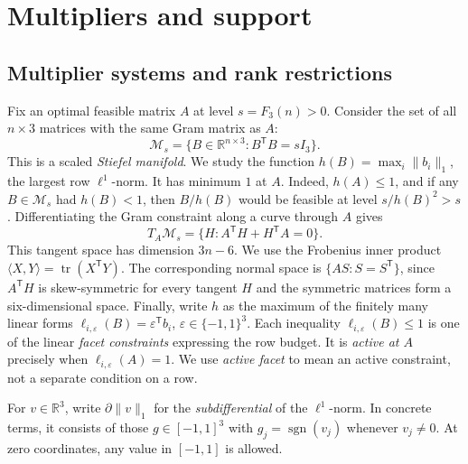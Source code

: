 \documentclass[11pt]{article}
\numberwithin{equation}{section}
\theoremstyle{definition}
\theoremstyle{definition}
\newcommand{\R}{\mathbb R}
\newcommand{\F}{F_3}
\newcommand{\norm}[1]{\lVert#1\rVert}
\DeclareMathOperator{\tr}{tr}
\begin{document}
\section{Multipliers and support}
\label{sec:variation}
\subsection{Multiplier systems and rank restrictions}
Fix an optimal feasible matrix $A$ at level $s=\F(n)>0$.
Consider the set of all $n\times3$ matrices with the same Gram
matrix as $A$:
\[
 \mathcal M_s=\{B\in\R^{n\times3}:B^{\mathsf T}B=sI_3\}.
\]
This is a scaled \emph{Stiefel manifold}. We study the function
$h(B)=\max_i\norm{b_i}_1$, the largest row $\ell^1$-norm.
It has minimum $1$ at $A$.
Indeed, $h(A)\le1$, and if any $B\in\mathcal M_s$ had $h(B)<1$,
then $B/h(B)$ would be feasible at level $s/h(B)^2>s$.
Differentiating the Gram constraint along a curve through $A$ gives
\[
 T_A\mathcal M_s=\{H:A^{\mathsf T}H+H^{\mathsf T}A=0\}.
\]
This tangent space has dimension $3n-6$. We use the Frobenius
inner product $\langle X,Y\rangle=\tr(X^{\mathsf T}Y)$.
The corresponding normal space is $\{AS:S=S^{\mathsf T}\}$, since
$A^{\mathsf T}H$ is skew-symmetric for every tangent $H$ and the
symmetric matrices form a six-dimensional space.
Finally, write $h$ as the maximum of the finitely many linear forms
$\ell_{i,\varepsilon}(B)=\varepsilon^{\mathsf T}b_i$,
$\varepsilon\in\{-1,1\}^3$. Each inequality
$\ell_{i,\varepsilon}(B)\le1$ is one of the linear \emph{facet
constraints} expressing the row budget. It is \emph{active at $A$}
precisely when $\ell_{i,\varepsilon}(A)=1$. We use \emph{active facet}
to mean an active constraint, not a separate condition on a row.

For $v\in\R^3$, write $\partial\|v\|_1$ for the \emph{subdifferential}
of the $\ell^1$-norm. In concrete terms, it consists of those
$g\in[-1,1]^3$ with $g_j=\operatorname{sgn}(v_j)$ whenever $v_j\ne0$.
At zero coordinates, any value in $[-1,1]$ is allowed.
\end{document}
